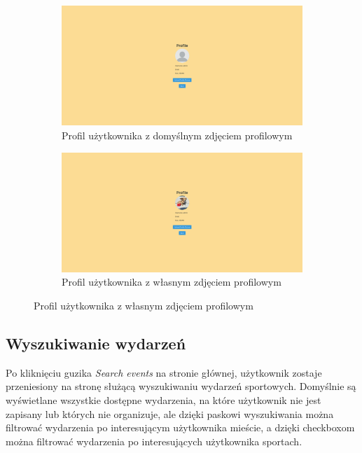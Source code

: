 \documentclass[11pt,a4paper]{article}
\begin{document}
\begin{figure}[H]
    \centering
    \captionsetup{justification=centering,margin=2cm}
        \begin{subfigure}{0.49\textwidth}
            \includegraphics[width=\textwidth]{pages/account.png}
            \caption{Profil użytkownika z domyślnym zdjęciem profilowym}
        \end{subfigure}
    \hfill
        \begin{subfigure}{0.49\textwidth}
            \includegraphics[width=\textwidth]{pages/account_with_profile_picture.png}
            \caption{Profil użytkownika z własnym zdjęciem profilowym}
        \end{subfigure}
\end{figure}

\subsection{Wyszukiwanie wydarzeń}

Po kliknięciu guzika \textit{Search events} na stronie głównej, użytkownik zostaje przeniesiony na stronę służącą wyszukiwaniu wydarzeń sportowych. Domyślnie są wyświetlane wszystkie dostępne wydarzenia, na które użytkownik nie jest zapisany lub których nie organizuje, ale dzięki paskowi wyszukiwania można filtrować wydarzenia po interesującym użytkownika mieście, a dzięki checkboxom można filtrować wydarzenia po interesujących użytkownika sportach.
\end{document}
